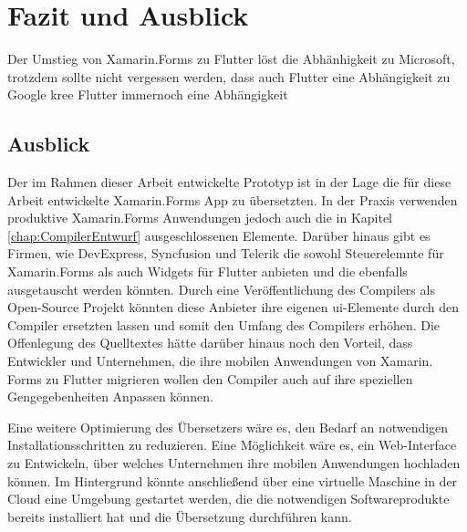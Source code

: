 \chapter{Fazit und Ausblick}
\label{chap:FazitAusblick}
Der Umstieg von Xamarin.Forms zu Flutter löst die Abhänhigkeit zu Microsoft, trotzdem sollte nicht vergessen werden, dass auch Flutter eine Abhängigkeit zu Google kree
Flutter immernoch eine Abhängigkeit

\section{Ausblick}
Der im Rahmen dieser Arbeit entwickelte Prototyp ist in der Lage die für diese Arbeit entwickelte Xamarin.Forms App zu übersetzten.  In der Praxis verwenden produktive Xamarin.Forms Anwendungen jedoch auch die in Kapitel \ref{chap:CompilerEntwurf} ausgeschlossenen Elemente.  Darüber hinaus gibt es Firmen, wie DevExpress, Syncfusion und Telerik die sowohl Steuerelemnte für Xamarin.Forms als auch Widgets für Flutter anbieten und die ebenfalls ausgetauscht werden könnten.  Durch eine Veröffentlichung des Compilers als Open-Source Projekt könnten diese Anbieter ihre eigenen \ac{ui}-Elemente durch den Compiler ersetzten lassen und somit den Umfang des Compilers erhöhen.  Die Offenlegung des Quelltextes hätte darüber hinaus noch den Vorteil, dass Entwickler und Unternehmen, die ihre mobilen Anwendungen von Xamarin. Forms zu Flutter migrieren wollen den Compiler auch auf ihre speziellen Gengegebenheiten Anpassen können.

Eine weitere Optimierung des Übersetzers wäre es, den Bedarf an notwendigen Installationsschritten zu reduzieren.  Eine Möglichkeit wäre es,  ein Web-Interface zu Entwickeln, über welches Unternehmen ihre mobilen Anwendungen hochladen können. Im Hintergrund könnte anschließend über eine virtuelle Maschine in der Cloud eine Umgebung gestartet werden,  die die notwendigen Softwareprodukte bereits installiert hat und die Übersetzung durchführen kann.  



